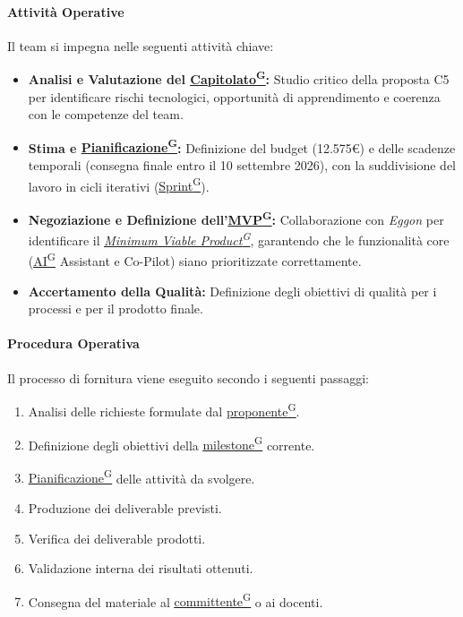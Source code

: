 \documentclass[a4paper,12pt]{article}
\providecommand{\glslink}[2]{\href{https://alittlebyte-19.github.io/Documentazione/glossario.html\#gls-#1}{\underline{#2}\textsuperscript{\scriptsize G}}}
\begin{document}
\paragraph{Attività Operative}
Il team si impegna nelle seguenti attività chiave:
\begin{itemize}
    \item \textbf{Analisi e Valutazione del \glslink{capitolato}{Capitolato}:} Studio critico della proposta C5 per identificare rischi tecnologici, opportunità di apprendimento e coerenza con le competenze del team.
    \item \textbf{Stima e \glslink{pianificazione}{Pianificazione}:} Definizione del budget (12.575€) e delle scadenze temporali (consegna finale entro il 10 settembre 2026), con la suddivisione del lavoro in cicli iterativi (\glslink{sprint}{Sprint}).
    \item \textbf{Negoziazione e Definizione dell’\glslink{mvp-minimum-viable-product}{MVP}:} Collaborazione con \textit{Eggon} per identificare il \textit{\glslink{mvp-minimum-viable-product}{Minimum Viable Product}}, garantendo che le funzionalità core (\glslink{intelligenza-artificiale-ai}{AI} Assistant e Co-Pilot) siano prioritizzate correttamente.
    \item \textbf{Accertamento della Qualità:} Definizione degli obiettivi di qualità per i processi e per il prodotto finale.
\end{itemize}

\paragraph{Procedura Operativa}
Il processo di fornitura viene eseguito secondo i seguenti passaggi:

\begin{enumerate}
    \item Analisi delle richieste formulate dal \glslink{committente-proponente}{proponente}.
    \item Definizione degli obiettivi della \glslink{milestone}{milestone} corrente.
    \item \glslink{pianificazione}{Pianificazione} delle attività da svolgere.
    \item Produzione dei deliverable previsti.
    \item Verifica dei deliverable prodotti.
    \item Validazione interna dei risultati ottenuti.
    \item Consegna del materiale al \glslink{committente-proponente}{committente} o ai docenti.
\end{enumerate}
\end{document}
